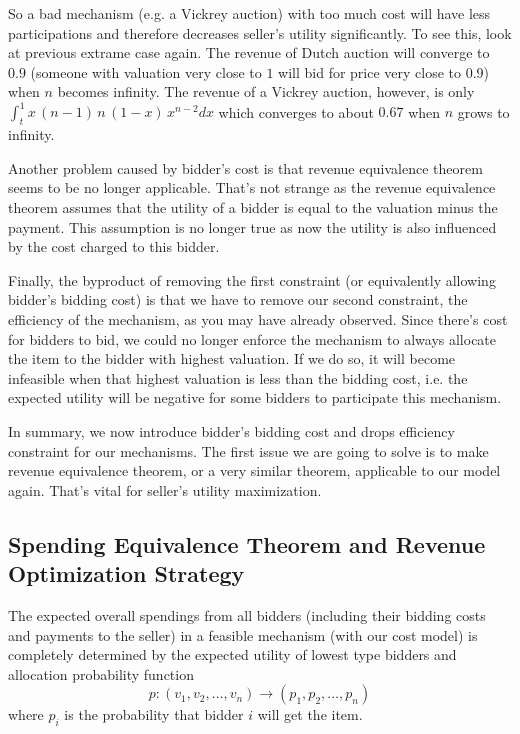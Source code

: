 So a bad mechanism (e.g. a Vickrey auction) with too much cost will have less
participations and therefore decreases seller's utility significantly.  To see
this, look at previous extrame case again.  The revenue of Dutch auction will
converge to $0.9$ (someone with valuation very close to $1$ will bid for price
very close to $0.9$) when $n$ becomes infinity.  The revenue of a Vickrey
auction, however, is only $\int_t^1 x \, (n-1) \,n\,( 1-x) \,{x}^{n-2} dx$
which converges to about $0.67$ when $n$ grows to infinity.  

Another problem caused by bidder's cost is that revenue equivalence theorem
seems to be no longer applicable. That's not strange as the revenue equivalence
theorem assumes that the utility of a bidder is equal to the valuation minus
the payment. This assumption is no longer true as now the utility is also
influenced by the cost charged to this bidder.

Finally, the byproduct of removing the first constraint (or equivalently allowing
bidder's bidding cost) is that we have to remove our second constraint, the
efficiency of the mechanism, as you may have already observed. Since there's cost
for bidders to bid, we could no longer enforce the mechanism to always allocate
the item to the bidder with highest valuation. If we do so, it will become
infeasible when that highest valuation is less than the bidding cost, i.e. the
expected utility will be negative for some bidders to participate this
mechanism.

In summary, we now introduce bidder's bidding cost and drops efficiency
constraint for our mechanisms. The first issue we are going to solve is to make
revenue equivalence theorem, or a very similar theorem, applicable to our model
again. That's vital for seller's utility maximization.

\subsection{Spending Equivalence Theorem and Revenue Optimization Strategy}

\begin{theorem}\label{theorem:equivalence}

The expected overall spendings from all bidders (including their bidding costs
and payments to the seller) in a feasible mechanism (with our cost model) is
completely determined by the expected utility of lowest type bidders and
allocation probability function
$$p: (v_1, v_2, \ldots, v_n) \rightarrow (p_1, p_2, \ldots, p_n)$$ 
where $p_i$ is the probability that bidder $i$ will get the item.

\end{theorem}

